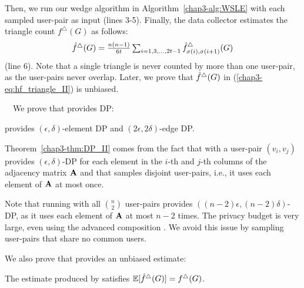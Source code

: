 Then, we run our wedge algorithm \AlgWSLE{} in Algorithm~\ref{chap3-alg:WSLE} with each sampled user-pair as input (lines 3-5).
Finally, the data collector estimates the triangle count $f^\triangle(G)$ as follows:
\begin{align}
    \textstyle{\hat{f}^\triangle(G) = \frac{n(n-1)}{6t} \sum_{i=1, 3, \ldots, 2t-1} \hat{f}_{\sigma(i),\sigma(i+1)}^\triangle(G)}
   \label{chap3-eq:hf_triangle_II}
\end{align}
(line 6). 
Note that a single triangle is never counted by more than one user-pair, as the user-pairs never overlap. 
Later, we prove that $\hat{f}^\triangle(G)$ in (\ref{chap3-eq:hf_triangle_II}) is unbiased.

\smallskip
{}~~We prove that
\AlgWSTri{} provides DP:
\begin{theorem}
\label{chap3-thm:DP_II}
\AlgWSTri{} provides $(\epsilon, \delta)$-element DP and $(2\epsilon, 2\delta)$-edge DP.
\end{theorem}
Theorem~\ref{chap3-thm:DP_II} comes from the fact that
\AlgWSLE{} with a user-pair $(v_i,v_j)$ provides $(\epsilon,\delta)$-DP for each element in the $i$-th and $j$-th columns of the adjacency matrix $\mathbf{A}$ and that \AlgWSTri{} samples disjoint user-pairs, i.e., it uses each element of $\mathbf{A}$ at most once.

Note that running \AlgWSLE{} with all $\binom{n}{2}$ user-pairs 
provides $((n-2) \epsilon, (n-2) \delta)$-DP, as it uses each element of $\mathbf{A}$ at most $n-2$ times.
The privacy budget is very large, even using the advanced composition \cite{DP,Kairouz_ICML15}.
We avoid this issue by sampling user-pairs that share no common users.

We also prove that
\AlgWSTri{} provides an unbiased estimate:
\begin{theorem}
\label{chap3-thm:unbiased_II}
The estimate produced by \AlgWSTri{} satisfies $\allowbreak \operatorname{\mathbb{E}}[\hat{f}^\triangle(G)] = f^\triangle(G)$.
\end{theorem}

